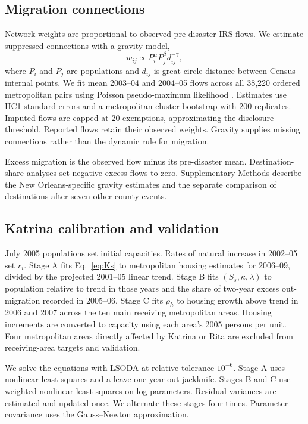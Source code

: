 \documentclass[11pt]{article}
\begin{document}
\subsection*{Migration connections}

Network weights are proportional to observed pre-disaster IRS flows. We estimate suppressed connections with a gravity model,
\begin{equation}
w_{ij}\propto P_i^\alpha P_j^\beta d_{ij}^{-\gamma},
\label{eq:gravity}
\end{equation}
where $P_i$ and $P_j$ are populations and $d_{ij}$ is great-circle distance between Census internal points. We fit mean 2003--04 and 2004--05 flows across all 38{,}220 ordered metropolitan pairs using Poisson pseudo-maximum likelihood \citep{SantosSilva2006}. Estimates use HC1 standard errors and a metropolitan cluster bootstrap with 200 replicates. Imputed flows are capped at 20 exemptions, approximating the disclosure threshold. Reported flows retain their observed weights. Gravity supplies missing connections rather than the dynamic rule for migration.

Excess migration is the observed flow minus its pre-disaster mean. Destination-share analyses set negative excess flows to zero. Supplementary Methods describe the New Orleans-specific gravity estimates and the separate comparison of destinations after seven other county events.

\subsection*{Katrina calibration and validation}

July 2005 populations set initial capacities. Rates of natural increase in 2002--05 set $r_i$. Stage A fits Eq.~\eqref{eq:Ks} to metropolitan housing estimates for 2006--09, divided by the projected 2001--05 linear trend. Stage B fits $(S_s,\kappa,\lambda)$ to population relative to trend in those years and the share of two-year excess out-migration recorded in 2005--06. Stage C fits $\rho_h$ to housing growth above trend in 2006 and 2007 across the ten main receiving metropolitan areas. Housing increments are converted to capacity using each area's 2005 persons per unit. Four metropolitan areas directly affected by Katrina or Rita are excluded from receiving-area targets and validation.

We solve the equations with LSODA at relative tolerance $10^{-6}$. Stage A uses nonlinear least squares and a leave-one-year-out jackknife. Stages B and C use weighted nonlinear least squares on log parameters. Residual variances are estimated and updated once. We alternate these stages four times. Parameter covariance uses the Gauss--Newton approximation.
\end{document}

